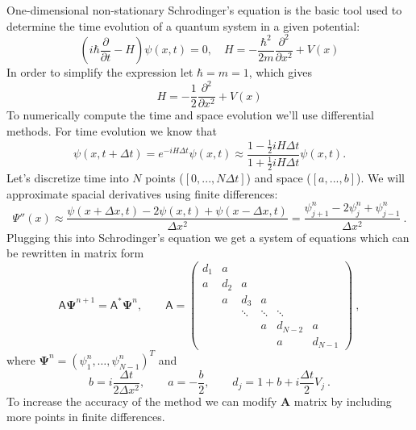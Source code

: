 \documentclass[12pt, a4paper]{article}
\begin{document}
One-dimensional non-stationary Schrodinger's equation is the basic tool used to determine the time evolution of a quantum system in a given potential:
\begin{equation*}
  \left(i\hbar\frac{\partial}{\partial t}-H\right)\psi(x,t)=0,\quad H=-\frac{\hbar^2}{2m}\frac{\partial^2}{\partial x^2}+V(x)
\end{equation*}
In order to simplify the expression let $\hbar = m = 1$, which gives
\begin{equation*}
    H=-\frac{1}{2}\frac{\partial^2}{\partial x^2}+V(x)
\end{equation*}
To numerically compute the time and space evolution we'll use differential methods. For time evolution we know that
\begin{equation*}
  \psi(x,t+\Delta t)=e^{-i H \Delta t} \psi(x,t)\approx \frac{1-\frac{1}{2} i H \Delta t}{1+\frac{1}{2} i H \Delta t}\psi(x,t).
\end{equation*}
Let's discretize time into $N$ points ($[0, ..., N\Delta t]$) and space ($[a, ... , b]$). We will approximate spacial derivatives using finite differences:
\begin{equation*}
  \Psi''(x)\approx \frac{\psi(x+\Delta x,t)-2\psi(x,t)+\psi(x-\Delta x,t)}{\Delta x^2}=\frac{\psi_{j+1}^n - 2\psi_j^n+\psi_{j-1}^n}{\Delta x^2}\>.
\end{equation*}
Plugging this into Schrodinger's equation we get a system of equations which can be rewritten in matrix form
\begin{equation*}
  \mathsf{A}\boldsymbol{\Psi}^{n+1}=\mathsf{A}^\ast \boldsymbol{\Psi}^n,\qquad
  \mathsf{A}=\begin{pmatrix}
  d_1 & a \\
  a   & d_2 & a \\
  & a & d_3 & a \\
  & & \ddots & \ddots & \ddots \\
  & & & a & d_{N-2} & a \\
  & & & & a & d_{N-1}
  \end{pmatrix}\>,
\end{equation*}
where $\boldsymbol{\Psi}^n=(\psi_1^n,\ldots,\psi_{N-1}^n)^T$ and
\begin{equation*}
  b=i \frac{\Delta t}{2 \Delta x^2},\qquad a=-\frac{b}{2},\qquad d_j = 1+b+i \frac{\Delta t}{2}V_j\>.
\end{equation*}
To increase the accuracy of the method we can modify $\boldsymbol{A}$ matrix by including more points in finite differences.
\end{document}
